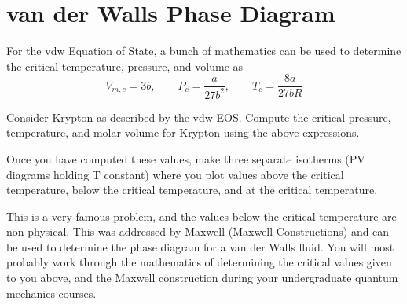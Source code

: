 \documentclass{article}
\newcommand{\be}{\begin{equation}}
\newcommand{\ee}{\end{equation}}
\begin{document}
\section{van der Walls Phase Diagram}
For the vdw Equation of State, a bunch of mathematics can be used to determine the critical temperature, pressure, and volume as
\be
V_{m,c} = 3b, \qquad P_c = \frac{a}{27b^2}, \qquad T_c = \frac{8a}{27bR}
\ee

Consider Krypton as described by the vdw EOS. 
Compute the critical pressure, temperature, and molar volume for Krypton using the above expressions.  

Once you have computed these values, make three separate isotherms (PV diagrams holding T constant) where you plot values  above the critical temperature, below the critical temperature, and at the critical temperature. 

This is a very famous problem, and the values below the critical temperature are non-physical.
This was addressed by Maxwell (Maxwell Constructions) and can be used to determine the phase diagram for a van der Walls fluid. 
You will most probably work through the mathematics of determining the critical values given to you above, and the Maxwell construction during your undergraduate quantum mechanics courses. 
\end{document}
